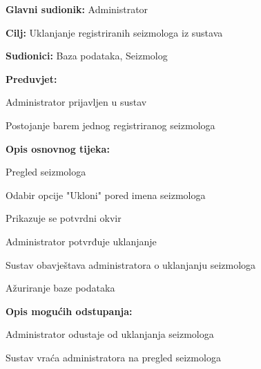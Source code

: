 					\noindent {}
					\begin{packed_item}
	
						\item \textbf{Glavni sudionik:} Administrator
						\item \textbf{Cilj:} Uklanjanje registriranih seizmologa iz sustava
						\item \textbf{Sudionici:} Baza podataka, Seizmolog
						\item \textbf{Preduvjet:} 
							\begin{packed_item}
								\item Administrator prijavljen u sustav
								\item Postojanje barem jednog registriranog seizmologa
							\end{packed_item}
						\item  \textbf{Opis osnovnog tijeka:}
						
						\item[] \begin{packed_enum}
	
							\item Pregled seizmologa
							\item Odabir opcije "Ukloni" pored imena seizmologa
							\item Prikazuje se potvrdni okvir
							\item Administrator potvrđuje uklanjanje
							\item Sustav obavještava administratora o uklanjanju seizmologa
							\item Ažuriranje baze podataka
							
						\end{packed_enum}
					\item \textbf{Opis mogućih odstupanja:}
					\item[] \begin{packed_item}
							\item[3.a] Administrator odustaje od uklanjanja seizmologa
							\item[] \begin{packed_enum}
								\item Sustav vraća administratora na pregled seizmologa
							\end{packed_enum}	
						\end{packed_item}
					\end{packed_item}

